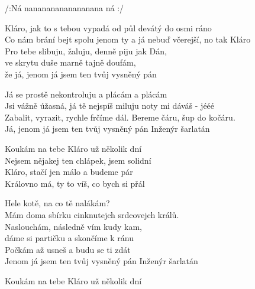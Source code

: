 
\cho{}
/:Ná nanananananananana ná  :/

\ve{}
Kláro, jak to s tebou vypadá od půl devátý do osmi ráno\\
Co nám brání bejt spolu jenom ty a já nebuď včerejší, no tak Kláro\\
Pro tebe slibuju, žaluju, denně piju jak Dán,\\
ve skrytu duše marně tajně doufám,\\
že já, jenom já jsem ten tvůj vysněný pán 

\cho{}

\ve{}
Já se prostě nekontroluju a plácám a plácám\\
Jsi vážně úžasná, já tě nejspíš miluju noty mi dáváš - jééé\\
Zabalit, vyrazit, rychle frčíme dál. Bereme čáru, šup do kočáru.\\
Já, jenom já jsem ten tvůj vysněný pán Inženýr šarlatán

Koukám na tebe Kláro už několik dní\\
Nejsem nějakej ten chlápek, jsem solidní \\
Kláro, stačí jen málo a budeme pár\\
Královno má, ty to víš, co bych si přál

\ve{}
Hele kotě, na co tě nalákám?\\
Mám doma sbírku cinknutejch srdcovejch králů.\\
Naslouchám, následně vím kudy kam,\\
dáme si partičku a skončíme k ránu\\
Počkám až usneš a budu se ti zdát\\
Jenom já jsem ten tvůj vysněný pán Inženýr šarlatán

Koukám na tebe Kláro už několik dní

\esong{}
